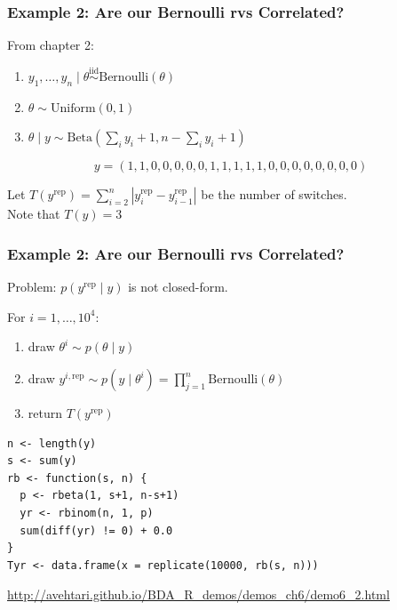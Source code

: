 \documentclass{beamer}
\begin{document}
\begin{frame}
\frametitle{Example 2: Are our Bernoulli rvs Correlated?}

From chapter 2:
\begin{enumerate}
\item $y_1, \ldots, y_n \mid \theta \overset{\text{iid}}{\sim} \text{Bernoulli}(\theta)$
\item $\theta \sim \text{Uniform}(0,1)$
\item $\theta \mid y \sim \text{Beta}(\sum_i y_i + 1, n - \sum_i y_i + 1)$
\end{enumerate}
\pause


\[
y = (1,1,0,0,0,0,0,1,1,1,1,1,0,0,0,0,0,0,0,0)
\]
\pause

Let $T(y^{\text{rep}}) =  \sum_{i=2}^n |y^{\text{rep}}_i - y^{\text{rep}}_{i-1}|$ be the number of switches. \\
Note that $T(y) = 3$
\end{frame}


\begin{frame}[fragile]
\frametitle{Example 2: Are our Bernoulli rvs Correlated?}

Problem: $p(y^{\text{rep}} \mid y)$ is not closed-form.
\newline

For $i=1,\ldots,  10^4$:
\begin{enumerate}
\item draw $\theta^i \sim p(\theta \mid y)$
\item draw $y^{i,\text{rep}} \sim p(y \mid \theta^i) = \prod_{j=1}^n \text{Bernoulli}(\theta)$
\item return $T(y^{\text{rep}})$
\end{enumerate}
\pause

\begin{verbatim}
n <- length(y)
s <- sum(y)
rb <- function(s, n) {
  p <- rbeta(1, s+1, n-s+1)
  yr <- rbinom(n, 1, p)
  sum(diff(yr) != 0) + 0.0
}
Tyr <- data.frame(x = replicate(10000, rb(s, n)))
\end{verbatim}

\url{http://avehtari.github.io/BDA_R_demos/demos_ch6/demo6_2.html}
\end{frame}
\end{document}
